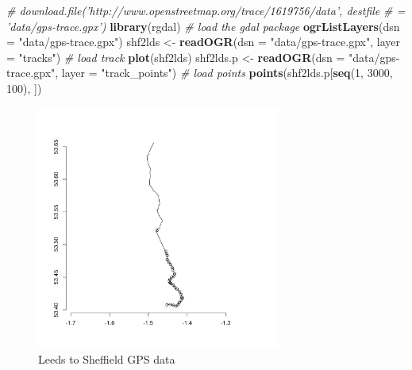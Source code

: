 \documentclass[]{article}
\newenvironment{Shaded}{}{}
\newcommand{\KeywordTok}[1]{\textcolor[rgb]{0.00,0.44,0.13}{\textbf{{#1}}}}
\newcommand{\DataTypeTok}[1]{\textcolor[rgb]{0.56,0.13,0.00}{{#1}}}
\newcommand{\DecValTok}[1]{\textcolor[rgb]{0.25,0.63,0.44}{{#1}}}
\newcommand{\StringTok}[1]{\textcolor[rgb]{0.25,0.44,0.63}{{#1}}}
\newcommand{\CommentTok}[1]{\textcolor[rgb]{0.38,0.63,0.69}{\textit{{#1}}}}
\newcommand{\NormalTok}[1]{{#1}}
\let\Oldincludegraphics\includegraphics
\renewcommand{\includegraphics}[1]{\Oldincludegraphics[width=8cm]{#1}}
\begin{document}
\begin{Shaded}
\begin{Highlighting}[]
\CommentTok{# download.file('http://www.openstreetmap.org/trace/1619756/data', destfile}
\CommentTok{# = 'data/gps-trace.gpx')}
\KeywordTok{library}\NormalTok{(rgdal)  }\CommentTok{# load the gdal package}
\KeywordTok{ogrListLayers}\NormalTok{(}\DataTypeTok{dsn =} \StringTok{"data/gps-trace.gpx"}\NormalTok{)}
\NormalTok{shf2lds <- }\KeywordTok{readOGR}\NormalTok{(}\DataTypeTok{dsn =} \StringTok{"data/gps-trace.gpx"}\NormalTok{, }\DataTypeTok{layer =} \StringTok{"tracks"}\NormalTok{)  }\CommentTok{# load track}
\KeywordTok{plot}\NormalTok{(shf2lds)}
\NormalTok{shf2lds.p <- }\KeywordTok{readOGR}\NormalTok{(}\DataTypeTok{dsn =} \StringTok{"data/gps-trace.gpx"}\NormalTok{, }\DataTypeTok{layer =} \StringTok{"track_points"}\NormalTok{)  }\CommentTok{# load points}
\KeywordTok{points}\NormalTok{(shf2lds.p[}\KeywordTok{seq}\NormalTok{(}\DecValTok{1}\NormalTok{, }\DecValTok{3000}\NormalTok{, }\DecValTok{100}\NormalTok{), ])}
\end{Highlighting}
\end{Shaded}
\begin{figure}[htbp]
\centering
\includegraphics{figure/Leeds_to_Sheffield_GPS_data.png}
\caption{Leeds to Sheffield GPS data}
\end{figure}
\end{document}
